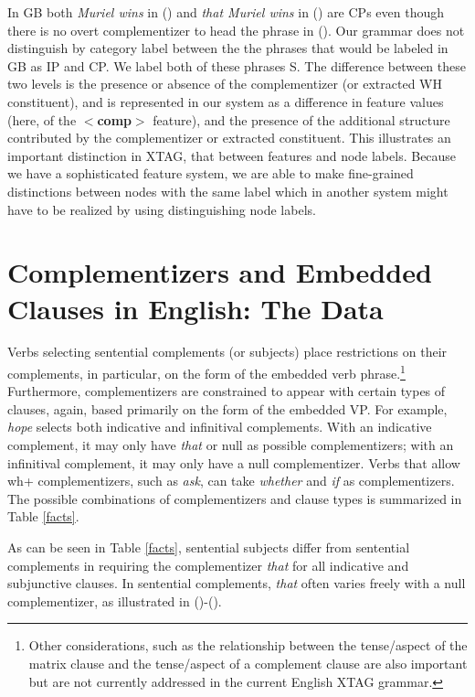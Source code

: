
 In GB both {\it Muriel wins} in () and {\it that Muriel wins} in
() are CPs even though there is no overt complementizer to head the
phrase in ().  Our grammar does not distinguish by category label
between the the phrases that would be labeled in GB as IP and CP.  We label
both of these phrases S.  The difference between these two levels is the
presence or absence of the complementizer (or extracted WH constituent), and is
represented in our system as a difference in feature values (here, of the {\bf
$<$comp$>$} feature), and the presence of the additional structure contributed
by the complementizer or extracted constituent.  This illustrates an important
distinction in XTAG, that between features and node labels.  Because we have a
sophisticated feature system, we are able to make fine-grained distinctions
between nodes with the same label which in another system might have to be
realized by using distinguishing node labels.
 
\section{Complementizers and Embedded Clauses in English:  The
Data}
\label{data}

Verbs selecting sentential complements (or subjects) place restrictions on
their complements, in particular, on the form of the embedded verb
phrase.\footnote{Other considerations, such as the relationship between the
tense/aspect of the matrix clause and the tense/aspect of a complement clause
are also important but are not currently addressed in the current English XTAG
grammar.}  Furthermore, complementizers are constrained to appear with certain
types of clauses, again, based primarily on the form of the embedded VP.  For
example, {\it hope\/} selects both indicative and infinitival complements. With
an indicative complement, it may only have {\it that\/} or null as possible
complementizers; with an infinitival complement, it may only have a null
complementizer.  Verbs that allow wh+ complementizers, such as {\it ask}, can
take {\it whether} and {\it if} as complementizers.  The possible combinations
of complementizers and clause types is summarized in Table \ref{facts}.

As can be seen in Table \ref{facts}, sentential subjects differ from
sentential complements in requiring the complementizer {\it that\/}
for all indicative and subjunctive clauses.  In sentential complements,
{\it that\/} often varies freely with a null complementizer, as
illustrated in ()-().


